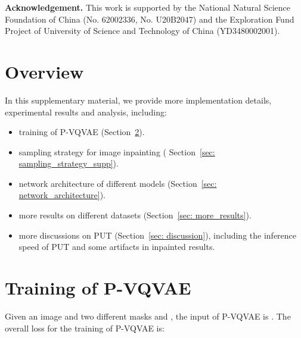\documentclass[10pt,twocolumn,letterpaper]{article}
\newcommand{\Sref}[1]{Section~\ref{#1}}
\begin{document}
\vspace{12pt}
\noindent\textbf{Acknowledgement.} 
This work is supported by the National Natural Science Foundation of China (No. 62002336, No. U20B2047) and the Exploration Fund Project of University of Science and Technology of China (YD3480002001).


{\small


}

\clearpage

\appendix




\section{Overview}
In this supplementary material, we provide more implementation details, experimental results and analysis, including:
\begin{itemize}
    \item training of P-VQVAE (\Sref{sec: traning_of_p_vqvae}).
    \item sampling strategy for image inpainting ( \Sref{sec: sampling_strategy_supp}).
    \item network architecture of different models (\Sref{sec: network_architecture}).
    \item more results on different datasets (\Sref{sec: more_results}). 
    
    \item more discussions on PUT (\Sref{sec: discussion}), including 
    the inference speed of PUT and some artifacts in inpainted results.
    
\end{itemize}


\section{Training of P-VQVAE}
\label{sec: traning_of_p_vqvae}
Given an image  and two different masks  and , the input of P-VQVAE is . The overall loss for the training of P-VQVAE is:
\end{document}

